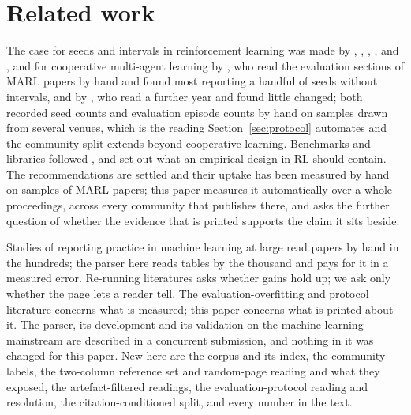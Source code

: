 \documentclass[sigconf,anonymous]{aamas}
\begin{document}
\section{Related work}
\label{sec:related}

The case for seeds and intervals in reinforcement learning was made by
\citet{henderson2017deep}, \citet{islam2017reproducibility},
\citet{colas2018how,colas2019hitchhiker}, \citet{jordan2020evaluating},
\citet{chan2020measuring} and \citet{agarwal2021deep}, and for cooperative
multi-agent learning by \citet{gorsane2022towards}, who read the evaluation
sections of MARL papers by hand and found most reporting a handful of seeds
without intervals, and by \citet{singh2023how}, who read a further year and
found little changed; both recorded seed counts and evaluation episode
counts by hand on samples drawn from several venues, which is the reading
Section~\ref{sec:protocol} automates and the community split extends
beyond cooperative learning. Benchmarks and libraries followed
\cite{papoudakis2021benchmarking,ellis2023smacv2,bettini2024benchmarl}, and
\citet{patterson2024empirical} set out what an empirical design in RL should
contain. The recommendations are settled and their uptake has been measured by hand
on samples of MARL papers; this paper measures it automatically over a whole
proceedings, across every community that publishes there, and asks the
further question of whether the evidence that is printed supports the claim
it sits beside.

Studies of reporting practice in machine learning at large
\cite{dodge2019show,bouthillier2021accounting,christodoulou2025false,hutchinson2022evaluation}
read papers by hand in the hundreds; the parser here reads tables by the
thousand and pays for it in a measured error. Re-running literatures
\cite{henderson2017deep,musgrave2020metric,dacrema2019really} asks whether
gains hold up; we ask only whether the page lets a reader tell. The
evaluation-overfitting and protocol literature
\cite{whiteson2011protecting,machado2018revisiting,balduzzi2018reevaluating}
concerns what is measured; this paper concerns what is printed about it. The
parser, its development and its validation on the machine-learning
mainstream are described in a concurrent submission, and nothing in it was
changed for this paper. New here are the corpus and its index, the community
labels, the two-column reference set and random-page reading and what they
exposed, the artefact-filtered readings, the evaluation-protocol reading and
resolution, the citation-conditioned split, and every number in the text.
\end{document}
